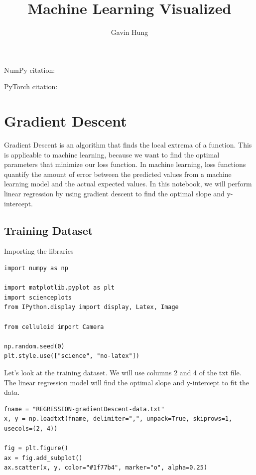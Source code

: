 \documentclass[openany]{book}
\title{Machine Learning Visualized}
\author{Gavin Hung}
\begin{document}
\maketitle

\tableofcontents
    
NumPy citation: \cite{harris2020array}

PyTorch citation: \cite{paszke2017automatic}
    
    \section{Gradient Descent}\label{gradient-descent}

Gradient Descent is an algorithm that finds the local extrema of a
function. This is applicable to machine learning, because we want to
find the optimal parameters that minimize our loss function. In machine
learning, loss functions quantify the amount of error between the
predicted values from a machine learning model and the actual expected
values. In this notebook, we will perform linear regression by using
gradient descent to find the optimal slope and y-intercept.

    \subsection{Training Dataset}\label{training-dataset}

    Importing the libraries

\begin{tcolorbox}
\tiny
\begin{verbatim}
import numpy as np

import matplotlib.pyplot as plt
import scienceplots
from IPython.display import display, Latex, Image

from celluloid import Camera

np.random.seed(0)
plt.style.use(["science", "no-latex"])
\end{verbatim}
\end{tcolorbox}

    Let's look at the training dataset. We will use columns 2 and 4 of the
txt file. The linear regression model will find the optimal slope and
y-intercept to fit the data.

\begin{tcolorbox}
\tiny
\begin{verbatim}
fname = "REGRESSION-gradientDescent-data.txt"
x, y = np.loadtxt(fname, delimiter=",", unpack=True, skiprows=1, usecols=(2, 4))

fig = plt.figure()
ax = fig.add_subplot()
ax.scatter(x, y, color="#1f77b4", marker="o", alpha=0.25)
\end{verbatim}
\end{tcolorbox}
        
\end{document}
